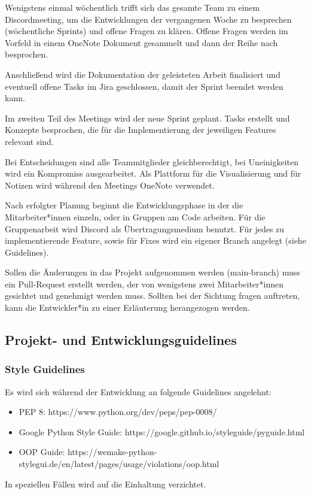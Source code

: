 \documentclass[a4paper,11pt]{scrartcl}
\begin{document}
Wenigstens einmal wöchentlich trifft sich das gesamte Team zu einem Discordmeeting, um die Entwicklungen der vergangenen Woche zu besprechen (wöchentliche Sprints) und offene Fragen zu klären. Offene Fragen werden im Vorfeld in einem OneNote Dokument gesammelt und dann der Reihe nach besprochen. 

Anschließend wird die Dokumentation der geleisteten Arbeit finalisiert und eventuell offene Tasks im Jira geschlossen, damit der Sprint beendet werden kann.

Im zweiten Teil des Meetings wird der neue Sprint geplant. Tasks erstellt und Konzepte besprochen, die für die Implementierung der jeweiligen Features relevant sind.

Bei Entscheidungen sind alle Teammitglieder gleichberechtigt, bei Uneinigkeiten wird ein Kompromiss ausgearbeitet. 
Als Plattform für die Visualisierung und für Notizen wird während den Meetings OneNote verwendet.

Nach erfolgter Planung beginnt die Entwicklungsphase in der die Mitarbeiter*innen einzeln, oder in Gruppen am Code arbeiten. Für die Gruppenarbeit wird Discord als Übertragungsmedium benutzt. Für jedes zu implementierende Feature, sowie für Fixes wird ein eigener Branch angelegt (siehe Guidelines). 

Sollen die Änderungen in das Projekt aufgenommen werden (main-branch) muss ein Pull-Request erstellt werden, der von wenigstens zwei Mitarbeiter*innen gesichtet und genehmigt werden muss. Sollten bei der Sichtung fragen auftreten, kann die Entwickler*in zu einer Erläuterung herangezogen werden.

\subsection{Projekt- und Entwicklungsguidelines}
\subsubsection{Style Guidelines}
Es wird sich während der Entwicklung an folgende Guidelines angelehnt: 
\begin{itemize}
\item PEP 8: https://www.python.org/dev/peps/pep-0008/
\item Google Python Style Guide: https://google.github.io/styleguide/pyguide.html
\item OOP Guide: https://wemake-python-stylegui.de/en/latest/pages/usage/violations/oop.html
\end{itemize}
In speziellen Fällen wird auf die Einhaltung verzichtet. 
\end{document}
